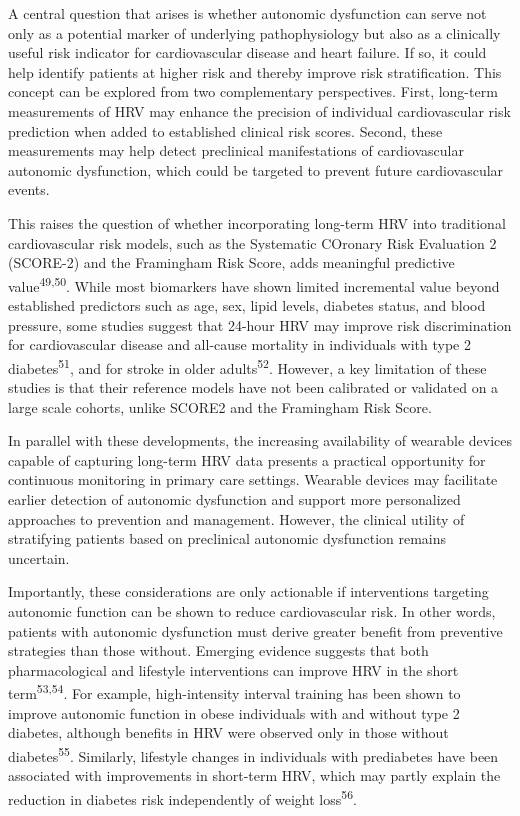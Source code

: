 \documentclass[
  a4paper,
  headsepline=true,
  open=any]{scrbook}
\begin{document}
A central question that arises is whether autonomic dysfunction can
serve not only as a potential marker of underlying pathophysiology but
also as a clinically useful risk indicator for cardiovascular disease
and heart failure. If so, it could help identify patients at higher risk
and thereby improve risk stratification. This concept can be explored
from two complementary perspectives. First, long-term measurements of
HRV may enhance the precision of individual cardiovascular risk
prediction when added to established clinical risk scores. Second, these
measurements may help detect preclinical manifestations of
cardiovascular autonomic dysfunction, which could be targeted to prevent
future cardiovascular events.

This raises the question of whether incorporating long-term HRV into
traditional cardiovascular risk models, such as the Systematic COronary
Risk Evaluation 2 (SCORE-2) and the Framingham Risk Score, adds
meaningful predictive value\textsuperscript{49,50}. While most
biomarkers have shown limited incremental value beyond established
predictors such as age, sex, lipid levels, diabetes status, and blood
pressure, some studies suggest that 24-hour HRV may improve risk
discrimination for cardiovascular disease and all-cause mortality in
individuals with type 2 diabetes\textsuperscript{51}, and for stroke in
older adults\textsuperscript{52}. However, a key limitation of these
studies is that their reference models have not been calibrated or
validated on a large scale cohorts, unlike SCORE2 and the Framingham
Risk Score.

In parallel with these developments, the increasing availability of
wearable devices capable of capturing long-term HRV data presents a
practical opportunity for continuous monitoring in primary care
settings. Wearable devices may facilitate earlier detection of autonomic
dysfunction and support more personalized approaches to prevention and
management. However, the clinical utility of stratifying patients based
on preclinical autonomic dysfunction remains uncertain.

Importantly, these considerations are only actionable if interventions
targeting autonomic function can be shown to reduce cardiovascular risk.
In other words, patients with autonomic dysfunction must derive greater
benefit from preventive strategies than those without. Emerging evidence
suggests that both pharmacological and lifestyle interventions can
improve HRV in the short term\textsuperscript{53,54}. For example,
high-intensity interval training has been shown to improve autonomic
function in obese individuals with and without type 2 diabetes, although
benefits in HRV were observed only in those without
diabetes\textsuperscript{55}. Similarly, lifestyle changes in
individuals with prediabetes have been associated with improvements in
short-term HRV, which may partly explain the reduction in diabetes risk
independently of weight loss\textsuperscript{56}.
\end{document}

